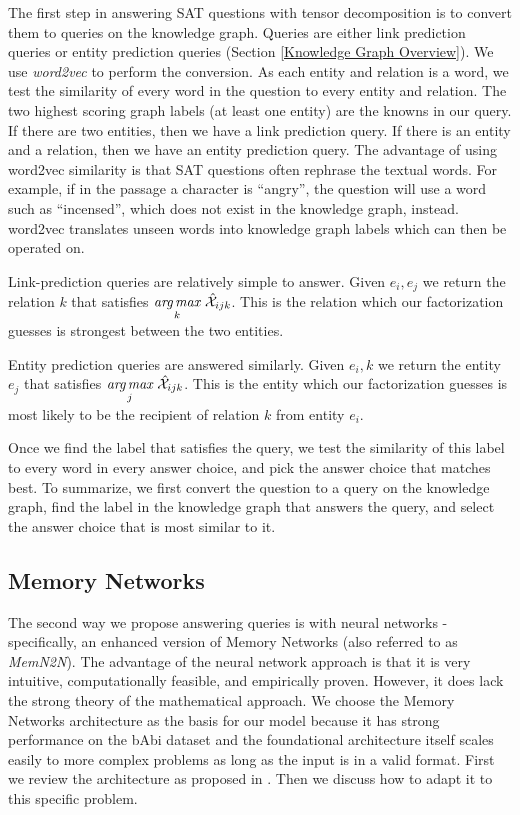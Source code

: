 \documentclass[pageno]{final_paper}
\begin{document}
The first step in answering SAT questions with tensor decomposition is to
convert them to queries on the knowledge graph. Queries are either link
prediction queries or entity prediction queries (Section \ref{Knowledge Graph
Overview}). We use \textit{word2vec} to perform the conversion. As each entity
and relation is a word, we test the similarity of every word in the question to
every entity and relation. The two highest scoring graph labels (at least one
entity) are the knowns in our query. If there are two entities, then we have a
link prediction query. If there is an entity and a relation, then we have an
entity prediction query. The advantage of using word2vec similarity is that SAT
questions often rephrase the textual words. For example, if in the passage a
character is ``angry'', the question will use a word such as ``incensed'', which
does not exist in the knowledge graph, instead. word2vec translates unseen words
into  knowledge graph labels which can then be operated on.

Link-prediction queries are relatively simple to answer. Given $e_i, e_j$ we
return the relation $k$ that satisfies $\underset{k}{{\textit{arg}}\,{\textit{max}}}\,\, \hat{\mathcal{X}}_{ijk}$.
This is the relation which our factorization guesses is strongest between the
two entities.

Entity prediction queries are answered similarly. Given $e_i, k$ we return the
entity $e_j$ that satisfies $\underset{j}{{\textit{arg}}\,{\textit{max}}}\,\, \hat{\mathcal{X}}_{ijk}$. This is
the entity which our factorization guesses is most likely to be the recipient of
relation $k$ from entity $e_i$.

Once we find the label that satisfies the query, we test the similarity of this
label to every word in every answer choice, and pick the answer choice that
matches best. To summarize, we first convert the question to a query on the
knowledge graph, find the label in the knowledge graph that answers the query,
and select the answer choice that is most similar to it.

\subsection{Memory Networks}
\label{Memory Networks}

The second way we propose answering queries is with neural networks -
specifically, an enhanced version of Memory Networks (also referred to as
\textit{MemN2N}). The advantage of the neural network approach is that it is
very intuitive, computationally feasible, and empirically proven. However, it
does lack the strong theory of the mathematical approach. We choose the Memory
Networks architecture as the basis for our model because it has strong
performance on the bAbi dataset and the foundational architecture itself scales
easily to more complex problems as long as the input is in a valid format. First
we review the architecture as proposed in \cite{Sukhbaatar2015}. Then we discuss
how to adapt it to this specific problem.
\end{document}

